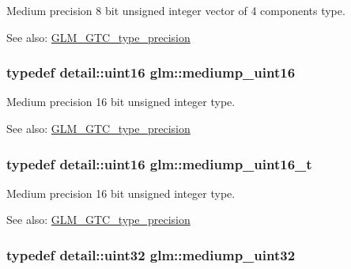 Medium precision 8 bit unsigned integer vector of 4 components type. \begin{Desc}
\item[See also:]\hyperlink{group__gtc__type__precision}{GLM\_\-GTC\_\-type\_\-precision} \end{Desc}
\hypertarget{group__gtc__type__precision_g2cef3a0d7b0fce75c9885f64656d8933}{
\subsubsection[mediump\_\-uint16]{\setlength{\rightskip}{0pt plus 5cm}typedef detail::uint16 {\bf glm::mediump\_\-uint16}}}
\label{group__gtc__type__precision_g2cef3a0d7b0fce75c9885f64656d8933}


Medium precision 16 bit unsigned integer type. \begin{Desc}
\item[See also:]\hyperlink{group__gtc__type__precision}{GLM\_\-GTC\_\-type\_\-precision} \end{Desc}
\hypertarget{group__gtc__type__precision_g0b385466deac5ac96061ef2cdd6db20f}{
\subsubsection[mediump\_\-uint16\_\-t]{\setlength{\rightskip}{0pt plus 5cm}typedef detail::uint16 {\bf glm::mediump\_\-uint16\_\-t}}}
\label{group__gtc__type__precision_g0b385466deac5ac96061ef2cdd6db20f}


Medium precision 16 bit unsigned integer type. \begin{Desc}
\item[See also:]\hyperlink{group__gtc__type__precision}{GLM\_\-GTC\_\-type\_\-precision} \end{Desc}
\hypertarget{group__gtc__type__precision_g861dbd1051f488e425b3966001b568e5}{
\subsubsection[mediump\_\-uint32]{\setlength{\rightskip}{0pt plus 5cm}typedef detail::uint32 {\bf glm::mediump\_\-uint32}}}
\label{group__gtc__type__precision_g861dbd1051f488e425b3966001b568e5}


